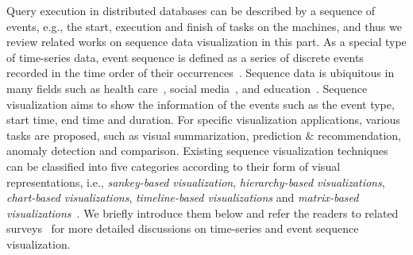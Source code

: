 %
%

Query execution in distributed databases can be described by a sequence of events, e.g., the start, execution and finish of tasks on the machines, and thus we review related works on sequence data visualization in this part. As a special type of time-series data, event sequence is defined as a series of discrete events recorded in the time order of their occurrences~\cite{guo2020survey}. Sequence data is ubiquitous in many fields such as health care~\cite{malik2015cohort, wongsuphasawat2011outflow}, social media~\cite{zhao2014fluxflow, law2018maqui}, and education~\cite{chen2015peakvizor, mu2019moocad, goulden2019ccvis, he2019vuc, chen2018viseq}. Sequence visualization aims to show the information of the events such as the event type, start time, end time and duration. For specific visualization applications, various tasks are proposed, such as visual summarization, prediction $\&$ recommendation, anomaly detection and comparison. Existing sequence visualization techniques can be classified into five categories according to their form of visual representations, i.e., \emph{sankey-based visualization}, \emph{hierarchy-based visualizations}, \emph{chart-based visualizations}, \emph{timeline-based visualizations} and \emph{matrix-based visualizations}~\cite{guo2020survey}. We briefly introduce them below and refer the readers to related surveys~\cite{guo2020survey, silva2000visualization} for more detailed discussions on time-series and event sequence visualization. 




